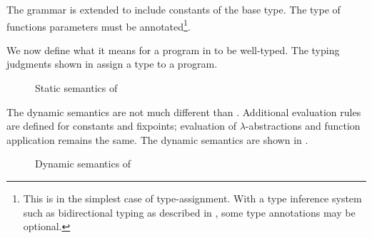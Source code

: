 The grammar is extended to include constants of the base type. The type of functions parameters must be annotated\footnote{This is in the simplest case of type-assignment. With a type inference system such as bidirectional typing as described in , some type annotations may be optional.}.

We now define what it means for a program in \stlc{} to be well-typed. The typing judgments shown in  assign a type to a \stlc{} program.

\begin{figure}
  \centering
  \begin{mdframed}
    \begin{singlespace}
    \end{singlespace}
  \end{mdframed}
  \caption{Static semantics of \stlc}
  \label{fig:statics-stlc}
\end{figure}

The dynamic semantics are not much different than \ulc{}. Additional evaluation rules are defined for constants and fixpoints; evaluation of $\lambda$-abstractions and function application remains the same. The dynamic semantics are shown in .

\begin{figure}
  \centering
  \begin{mdframed}
    \begin{singlespace}
    \end{singlespace}
  \end{mdframed}
  \caption{Dynamic semantics of \stlc}
  \label{fig:dynamics-stlc}
\end{figure}

